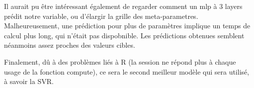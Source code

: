 \documentclass[11pt,a4paper]{article}
\begin{document}
Il aurait pu être intéressant également de regarder comment un mlp à 3 layers prédit notre variable, ou d'élargir la grille des meta-parametres. Malheureusement, une prédiction pour plus de paramètres implique un temps de calcul plus long, qui n'était pas dispobnible. Les prédictions obtenues semblent néanmoins assez proches des valeurs cibles.

Finalement, dû à des problèmes liés à R (la session ne répond plus à chaque usage de la fonction compute), ce sera le second meilleur modèle qui sera utilisé, à savoir la SVR.

\end{document}
